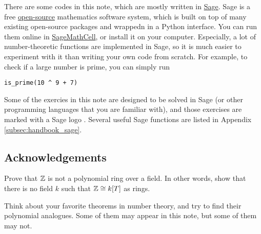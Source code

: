 There are some codes in this note, which are mostly written in \href{https://www.sagemath.org/}{Sage}.
Sage is a free \href{https://github.com/sagemath/sage}{open-source} mathematics software system, which is built on top of many existing open-source packages and wrappedn in a Python interface.
You can run them online in \href{https://sagecell.sagemath.org/}{SageMathCell}, or install it on your computer.
Especially, a lot of number-theoretic functions are implemented in Sage, so it is much easier to experiment with it than writing your own code from scratch.
For example, to check if a large number is prime, you can simply run
\begin{verbatim}
is_prime(10 ^ 9 + 7)
\end{verbatim}
Some of the exercies in this note are designed to be solved in Sage (or other programming languages that you are familiar with), and those exercises are marked with a Sage logo \sage.
Several useful Sage functions are listed in Appendix \ref{subsec:handbook_sage}.


\subsection*{Acknowledgements}


\begin{exercise}
    Prove that $\mathbb{Z}$ is not a polynomial ring over a field. In other words, show that there is no field $k$ such that $\mathbb{Z} \cong k[T]$ as rings.
\end{exercise}

\begin{exercise}
    Think about your favorite theorems in number theory, and try to find their polynomial analogues. Some of them may appear in this note, but some of them may not.
\end{exercise}


\newpage